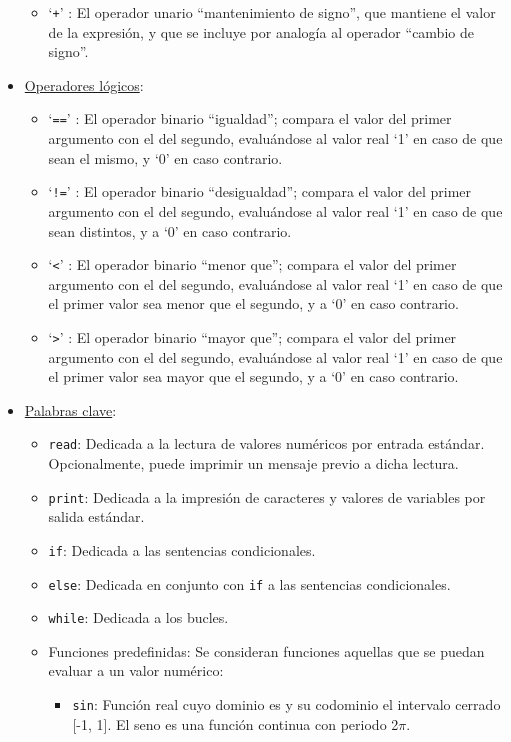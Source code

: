 \documentclass[12pt]{article}
\begin{document}
\begin{itemize}
\begin{itemize}
        \item `\texttt{+}' : El operador unario ``mantenimiento de signo'', que mantiene el valor de la expresión, y que se incluye por analogía al operador ``cambio de signo''.
    \end{itemize}
    \item \underline{Operadores lógicos}:
    \begin{itemize}
        \item `\texttt{==}' : El operador binario ``igualdad''; compara el valor del primer argumento con el del segundo, evaluándose al valor real `1' en caso de que sean el mismo, y `0' en caso contrario.
        \item `\texttt{!=}' : El operador binario ``desigualdad''; compara el valor del primer argumento con el del segundo, evaluándose al valor real `1' en caso de que sean distintos, y a `0' en caso contrario.
        \item `\texttt{<}' : El operador binario ``menor que''; compara el valor del primer argumento con el del segundo, evaluándose al valor real `1' en caso de que el primer valor sea menor que el segundo, y a `0' en caso contrario.
        \item `\texttt{>}' : El operador binario ``mayor que''; compara el valor del primer argumento con el del segundo, evaluándose al valor real `1' en caso de que el primer valor sea mayor que el segundo, y a `0' en caso contrario.
    \end{itemize}
    \item \underline{Palabras clave}: 
    \begin{itemize}
        \item \texttt{read}: Dedicada a la lectura de valores numéricos por entrada estándar. Opcionalmente, puede imprimir un mensaje previo a dicha lectura.
        \item \texttt{print}: Dedicada a la impresión de caracteres y valores de variables por salida estándar.
        \item \texttt{if}: Dedicada a las sentencias condicionales.
        \item \texttt{else}: Dedicada en conjunto con \texttt{if} a las sentencias condicionales.
        \item \texttt{while}: Dedicada a los bucles.
        \item Funciones predefinidas: Se consideran funciones aquellas que se puedan evaluar a un valor numérico:
        \begin{itemize}
            \item \texttt{sin}: Función real cuyo dominio es  y su codominio el intervalo cerrado [-1, 1]. El seno es una función continua con periodo 2$\pi$.

\end{itemize}
\end{itemize}
\end{itemize}
\end{document}

